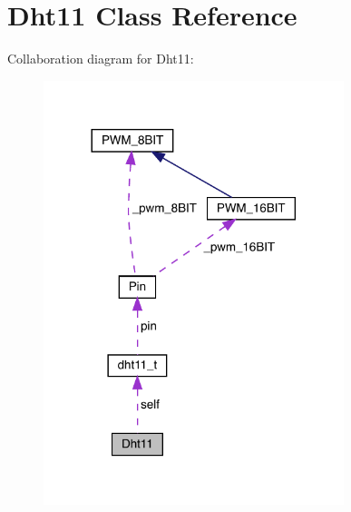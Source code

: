 \hypertarget{classDht11}{}\section{Dht11 Class Reference}
\label{classDht11}


Collaboration diagram for Dht11\+:\nopagebreak
\begin{figure}[H]
\begin{center}
\leavevmode
\includegraphics[width=248pt]{classDht11__coll__graph}
\end{center}
\end{figure}

